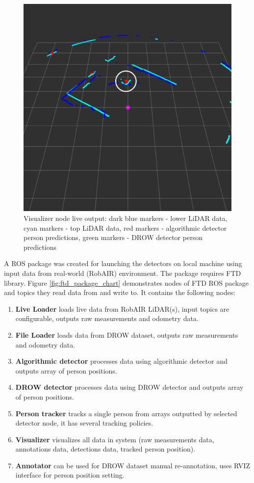 \documentclass{article}
\begin{document}
\begin{figure}[b!]
	\centering
	\includegraphics[width=0.75\linewidth]{ftd_live_output}
	\caption{Visualizer node live output: dark blue markers - lower LiDAR data, cyan markers - top LiDAR data, red markers - algorithmic detector person predictions, green markers - DROW detector person predictions}
	\label{fig:visualizer_node_live}
\end{figure}

A ROS package was created for launching the detectors on local machine using input data from real-world (RobAIR) environment.
The package requires FTD library.
Figure \ref{fig:ftd_package_chart} demonstrates nodes of FTD ROS package and topics they read data from and write to.
It contains the following nodes:

\begin{enumerate}
	\item \textbf{Live Loader} loads live data from RobAIR LiDAR(s), input topics are configurable, outputs raw measurements and odometry data.
	\item \textbf{File Loader} loads data from DROW dataset, outputs raw measurements and odometry data.
	\item \textbf{Algorithmic detector} processes data using algorithmic detector and outputs array of person positions.
	\item \textbf{DROW detector} processes data using DROW detector and outputs array of person positions.
	\item \textbf{Person tracker} tracks a single person from arrays outputted by selected detector node, it has several tracking policies.
	\item \textbf{Visualizer} visualizes all data in system (raw measurements data, annotations data, detections data, tracked person position).
	\item \textbf{Annotator} can be used for DROW dataset manual re-annotation, uses RVIZ interface for person position setting.
\end{enumerate}
\end{document}
